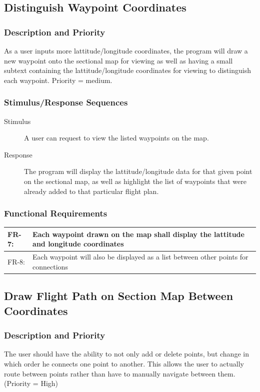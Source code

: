 \documentclass[12pt, letterpaper]{article}
\begin{document}
    \subsection{Distinguish Waypoint Coordinates}
      \subsubsection{Description and Priority}
		As a user inputs more lattitude/longitude coordinates, the program will
	    draw a new waypoint onto the sectional map for viewing as well
		as having a small subtext containing the lattitude/longitude coordinates
		for viewing to distinguish each waypoint. Priority = medium.
      \subsubsection{Stimulus/Response Sequences}
        \begin{description}
          \item[Stimulus] A user can request to view the listed waypoints on the map.
		  \item[Response] The program will display the lattitude/longitude data
			for that given point on the sectional map, as well as highlight the
			list of waypoints that were already added to that particular flight
			plan.
        \end{description}
      \subsubsection{Functional Requirements}
      \begin{tabularx}{\textwidth}{|l|X|} \hline
        FR-7: & Each waypoint drawn on the map shall display the lattitude and longitude coordinates\\ \hline
        FR-8: & Each waypoint will also be displayed as a list between other points for connections\\ \hline
        \end{tabularx}


      \subsection{Draw Flight Path on Section Map Between Coordinates}
        \subsubsection{Description and Priority}
        		The user should have the ability to not only add or delete points, but change in which
        		order he connects one point to another. This allows the user to actually route between
        		points rather than have to manually navigate between them. (Priority = High)
\end{document}
